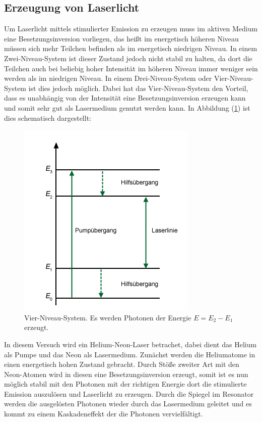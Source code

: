 \subsection{Erzeugung von Laserlicht}
Um Laserlicht mittels stimulierter Emission zu erzeugen muss im aktiven Medium eine Besetzungsinversion vorliegen, das heißt im energetisch höheren Niveau müssen sich mehr Teilchen befinden als im energetisch niedrigen Niveau. In einem
Zwei-Niveau-System ist dieser Zustand jedoch nicht stabil zu halten, da dort die Teilchen auch bei beliebig hoher Intensität im höheren Niveau immer weniger sein werden als im niedrigen Niveau. In einem Drei-Niveau-System oder Vier-Niveau-System ist dies jedoch möglich. Dabei hat das Vier-Niveau-System den Vorteil, dass es unabhängig von der Intensität eine Besetzungsinversion erzeugen kann und somit sehr gut als Lasermedium genutzt werden kann. In Abbildung (\ref{fig:4niveau}) ist dies schematisch dargestellt:
\begin{figure}[h!]
  \centering
  \includegraphics[scale=0.5]{fig/4niveau.jpg}
  \caption{Vier-Niveau-System. Es werden Photonen der Energie $E=E_\mathrm{2}-E_\mathrm{1}$ erzeugt. \cite{Anleitung4}}
  \label{fig:4niveau}
\end{figure}
\FloatBarrier
In diesem Versuch wird ein Helium-Neon-Laser betrachet, dabei dient das Helium als Pumpe und das Neon als Lasermedium. Zunächst werden die Heliumatome in einen energetisch hohen Zustand gebracht. Durch Stöße zweiter Art mit den Neon-Atomen wird in diesen eine Besetzungsinversion erzeugt, somit ist es nun möglich stabil mit den Photonen mit der richtigen Energie dort die stimulierte Emission auszulösen und Laserlicht zu erzeugen. Durch die Spiegel im Resonator werden die ausgelösten Photonen wieder durch das Lasermedium geleitet und es kommt zu einem Kaskadeneffekt der die Photonen vervielfältigt.
